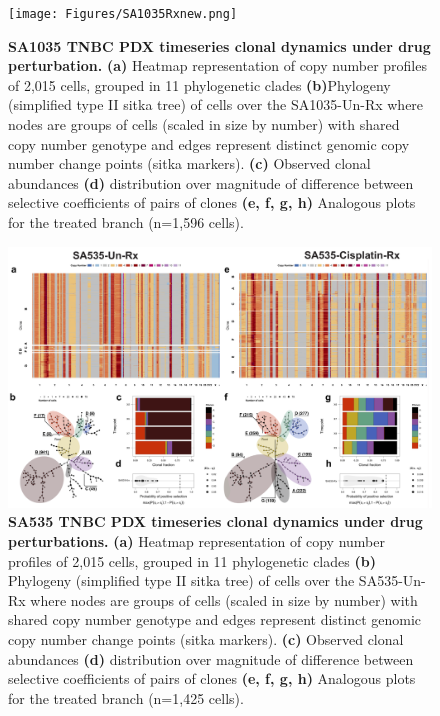 \begin{figure}
\centering
\texttt{[image: Figures/SA1035Rxnew.png]}
	
\caption[SA1035 TNBC PDX timeseries clonal dynamics under drug perturbation]
	{\small
	\textbf{SA1035 TNBC PDX timeseries clonal dynamics under drug perturbation.}
	    \textbf{(a)} Heatmap representation of copy number profiles of
2,015 cells, grouped in 11 phylogenetic clades  \textbf{(b)}Phylogeny (simplified type II sitka tree) of cells over the SA1035-Un-Rx where nodes are groups of cells (scaled in size by number) with shared copy number genotype and edges represent distinct genomic copy number change points (sitka markers). \textbf{(c)} Observed clonal abundances \textbf{(d)} distribution over magnitude of difference between selective coefficients of pairs of clones \textbf{(e, f, g, h)} Analogous plots for the treated branch (n=1,596 cells).
	}
	\label{fig:SA1035Rxnew}
\end{figure}

\begin{figure}
\centering
\includegraphics[width=\textwidth]{Figures/SA535analysis.png}
	
\caption[SA535 TNBC PDX timeseries clonal dynamics under drug perturbations]
	{\small
	\textbf{SA535 TNBC PDX timeseries clonal dynamics under drug perturbations.}
	     \textbf{(a)} Heatmap representation of copy number profiles of
2,015 cells, grouped in 11 phylogenetic clades  \textbf{(b)} Phylogeny (simplified type II sitka tree) of cells over the SA535-Un-Rx where nodes are groups of cells (scaled in size by number) with shared copy number genotype and edges represent distinct genomic copy number change points (sitka markers). \textbf{(c)} Observed clonal abundances \textbf{(d)} distribution over magnitude of difference between selective coefficients of pairs of clones \textbf{(e, f, g, h)} Analogous plots for the treated branch (n=1,425 cells).
	}
	\label{fig:SA535analysis}
\end{figure}


